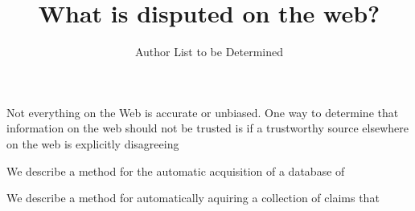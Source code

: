 \documentclass{www2010-submission}
\newcommand{\todo}[1]{}
\begin{document}
\toappear



\title{What is disputed on the web?}



\author{
Author List to be Determined
}




\maketitle




Not everything on the Web is accurate or unbiased. One way to determine that information on the web should not be trusted is if a trustworthy source elsewhere on the web is explicitly disagreeing 

We describe a method for the automatic acquisition of a database of 

We describe a method for automatically aquiring a collection of claims that 


\end{document}

